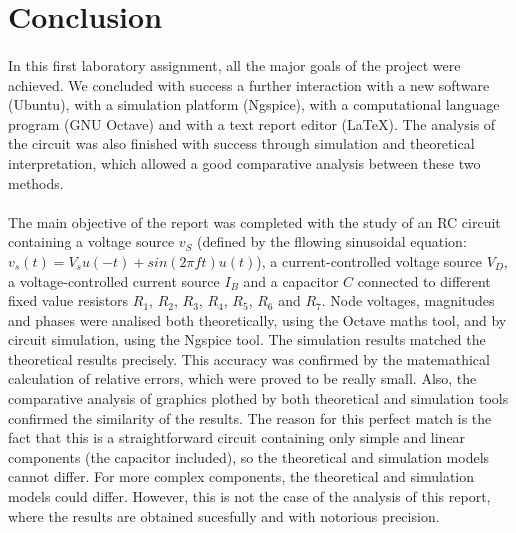 \section{Conclusion}
\label{sec:conclusion}

\paragraph{}
In this first laboratory assignment, all the major goals of the project were achieved. We concluded with success a further interaction with a new software (Ubuntu), with a simulation platform (Ngspice), with a computational language program (GNU Octave) and with a text report editor (LaTeX). The analysis of the circuit was also finished with success through simulation and theoretical interpretation, which allowed a good comparative analysis between these two methods.

\paragraph{}
The main objective of the report was completed with the study of an RC circuit containing a voltage source $v_S$ (defined by the fllowing sinusoidal equation: $v_s (t) = V_s u(−t) + sin(2 \pi ft)u(t) $), a current-controlled voltage source $V_D$, a voltage-controlled current source $I_B$ and a capacitor $C$ connected to different fixed value resistors $R_1$, $R_2$, $R_3$, $R_4$, $R_5$, $R_6$ and $R_7$. Node voltages, magnitudes and phases were analised both theoretically, using the Octave maths tool, and by circuit simulation, using the Ngspice tool. The simulation results matched the theoretical results precisely. This accuracy was confirmed by the matemathical calculation of relative errors, which were proved to be really small. Also, the comparative analysis of graphics plothed by both theoretical and simulation tools confirmed the similarity of the results. The reason for this perfect match is the fact that this is a straightforward circuit containing only simple and linear components (the capacitor included), so the theoretical and simulation models cannot differ. For more complex components, the theoretical and simulation models could differ. However, this is not the case of the analysis of this report, where the results are obtained sucesfully and with notorious precision.
